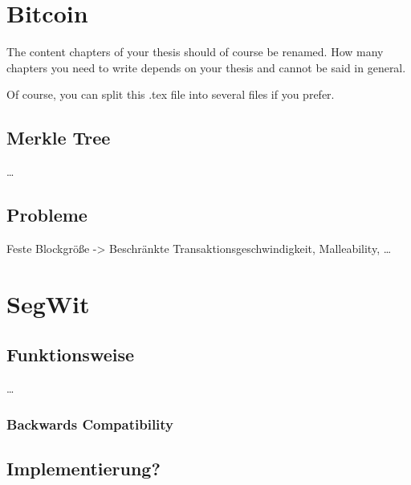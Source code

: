 
\section{Bitcoin}
\label{ch:FirstContentSection}

The content chapters of your thesis should of course be renamed. How many
chapters you need to write depends on your thesis and cannot be said in general.

Of course, you can split this .tex file into several files if you prefer. 


\subsection{Merkle Tree}
\label{sec:FirstContentSection:FirstSubSection}

\dots

\subsection{Probleme}
\label{sec:FirstContentSection:FirstSubSection}

Feste Blockgröße -> Beschränkte Transaktionsgeschwindigkeit, Malleability, \dots

\section{SegWit}
\label{ch:SecondContentSection}

\subsection{Funktionsweise}
\label{sec:SecondContentSection:FirstSubsection}

\dots

\subsubsection{Backwards Compatibility}

\subsection{Implementierung?}
\label{sec:SecondContentSection:SecondSubsection}

